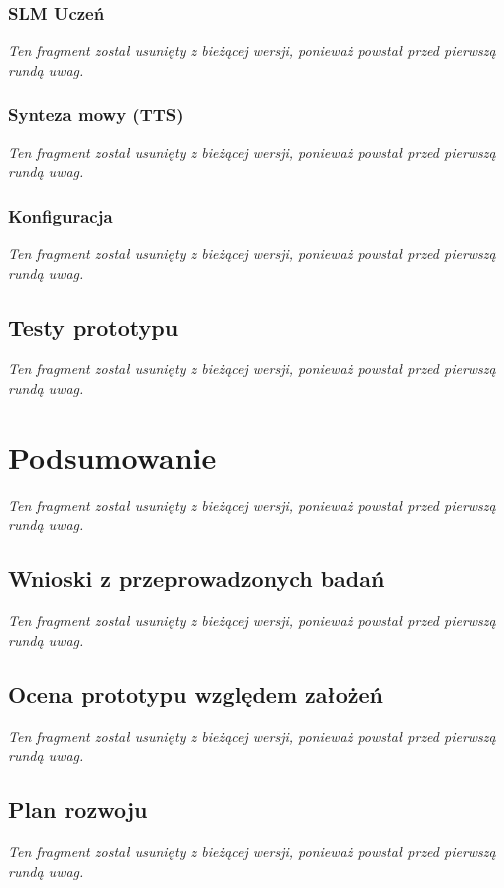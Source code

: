 \documentclass[
    a4paper,
    left=25mm,
    right=25mm,
    top=25mm,
    bottom=25mm,
    bindingoffset=5mm,
    nohyphenation=false
]{src/wut-thesis}
\newcommand{\nieredagowane}{%
\textit{Ten fragment został usunięty z bieżącej wersji, ponieważ powstał przed pierwszą rundą uwag.}%
}
\begin{document}
\subsubsection{SLM Uczeń}
\nieredagowane

\subsubsection{Synteza mowy (TTS)}
\nieredagowane

\subsubsection{Konfiguracja}
\nieredagowane

\subsection{Testy prototypu}
\nieredagowane

\newpage
\section{Podsumowanie}
\nieredagowane

\subsection{Wnioski z przeprowadzonych badań}
\nieredagowane

\subsection{Ocena prototypu względem założeń}
\nieredagowane

\subsection{Plan rozwoju}
\nieredagowane

\cleardoublepage
\printbibliography
\end{document}
